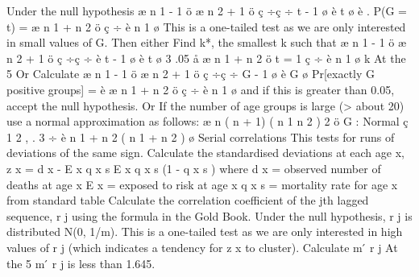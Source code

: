 \documentclass[a4paper,12pt]{article}
\begin{document}
Under the null hypothesis
æ n 1 - 1 ö æ n 2 + 1 ö
ç
÷ç
÷
t - 1 ø è t ø
è
.
P(G = t) =
æ n 1 + n 2 ö
ç
÷
è n 1 ø
This is a one-tailed test as we are only interested in small values of G.
Then either
Find k*, the smallest k such that
æ n 1 - 1 ö æ n 2 + 1 ö
ç
÷ç
÷
è t - 1 ø è t ø 3 .05
å æ n 1 + n 2 ö
t = 1
ç
÷
è n 1 ø
k
At the 5%
Or
Calculate
æ n 1 - 1 ö æ n 2 + 1 ö
ç
÷ç
÷
G - 1 ø è G ø
Pr[exactly G positive groups] = è
æ n 1 + n 2 ö
ç
÷
è n 1 ø
and if this is greater than 0.05, accept the null hypothesis.
Or
If the number of age groups is large (> about 20)
use a normal approximation as follows:
æ n ( n + 1) ( n 1 n 2 ) 2 ö
G : Normal ç 1 2
,
.
3 ÷
è n 1 + n 2 ( n 1 + n 2 ) ø
Serial correlations
This tests for runs of deviations of the same sign.
Calculate the standardised deviations at each age x, z x =
d x - E x q x s
E x q x s (1 - q x s )
where
d x = observed number of deaths at age x
E x = exposed to risk at age x
q x s = mortality rate for age x from standard table
Calculate the correlation coefficient of the jth lagged sequence, r j using the
formula in the Gold Book.
Under the null hypothesis, r j is distributed N(0, 1/m).
This is a one-tailed test as we are only interested in high values of r j (which
indicates a tendency for z x to cluster).
Calculate m  ́ r j
At the 5%
m  ́ r j is less than
1.645.
\end{document}
